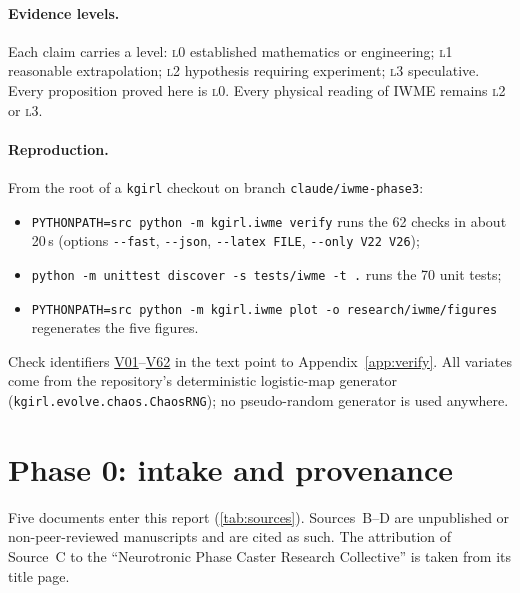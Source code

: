 \documentclass[11pt]{article}
\theoremstyle{definition}
\theoremstyle{remark}
\newcommand{\lvl}[1]{\textsc{l}#1}
\newcommand{\code}[1]{\texttt{#1}}
\newcommand{\V}[1]{\hyperref[app:verify]{\textsf{#1}}}
\begin{document}
\paragraph{Evidence levels.} Each claim carries a level: \lvl{0} established mathematics or engineering; \lvl{1} reasonable extrapolation; \lvl{2} hypothesis requiring experiment; \lvl{3} speculative. Every proposition proved here is \lvl{0}. Every physical reading of IWME remains \lvl{2} or \lvl{3}.

\paragraph{Reproduction.} From the root of a \code{kgirl} checkout on branch \code{claude/iwme-phase3}:
\begin{itemize}[leftmargin=1.4em]
\item \code{PYTHONPATH=src python -m kgirl.iwme verify} runs the 62 checks in about 20\,s (options \code{-{}-fast}, \code{-{}-json}, \code{-{}-latex FILE}, \code{-{}-only V22 V26});
\item \code{python -m unittest discover -s tests/iwme -t .} runs the 70 unit tests;
\item \code{PYTHONPATH=src python -m kgirl.iwme plot -o research/iwme/figures} regenerates the five figures.
\end{itemize}
Check identifiers \V{V01}--\V{V62} in the text point to Appendix~\ref{app:verify}. All variates come from the repository's deterministic logistic-map generator (\code{kgirl.evolve.chaos.ChaosRNG}); no pseudo-random generator is used anywhere.

\section{Phase 0: intake and provenance}

Five documents enter this report (\cref{tab:sources}). Sources~B--D are unpublished or non-peer-reviewed manuscripts and are cited as such. The attribution of Source~C to the ``Neurotronic Phase Caster Research Collective'' is taken from its title page.
\end{document}
